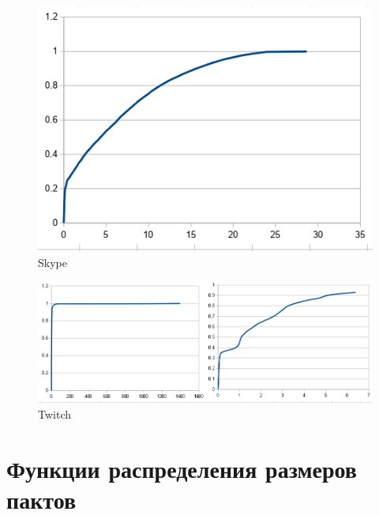 \documentclass[12pt, a4paper] {ncc}
\begin{document}
	\begin{figure}[h!]
    	\includegraphics[scale=0.4]{./img/skype_inter_distr.png}
		\caption{Skype}
	\end{figure}
	\begin{figure}[h!]
    	\includegraphics[scale=0.4]{./img/twitch_inter_dist.png}
		\caption{Twitch}
	\end{figure}

\section*{Функции распределения размеров пактов}
\end{document}
